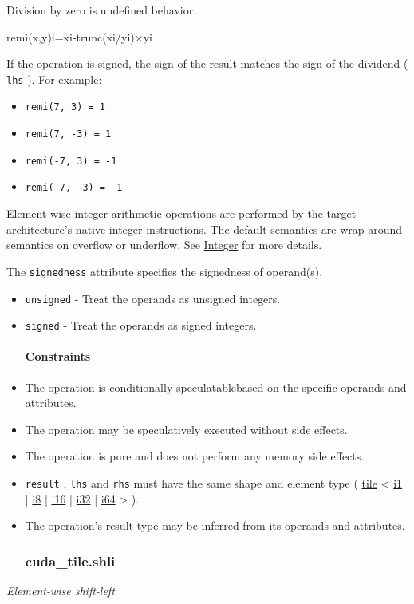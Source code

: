 \documentclass{article}
\begin{document}
Division by zero is undefined behavior.


remi(x,y)i=xi-trunc(xi/yi)×yi

If the operation is signed, the sign of the result matches the sign of the dividend ( \texttt{lhs} ). For example:


\begin{itemize}
\item \texttt{remi(7, 3) = 1}
\item \texttt{remi(7, -3) = 1}
\item \texttt{remi(-7, 3) = -1}
\item \texttt{remi(-7, -3) = -1}

\end{itemize}
Element-wise integer arithmetic operations are performed by the target architecture's native integer instructions. The default semantics are wrap-around semantics on overflow or underflow. See \href{https://docs.nvidia.com/cuda/tile-ir/latest/sections/operations.html#op-group-integer}{Integer} for more details.


The \texttt{signedness} attribute specifies the signedness of operand(s).


\begin{itemize}
\item \texttt{unsigned} - Treat the operands as unsigned integers.
\item \texttt{signed} - Treat the operands as signed integers.


\paragraph{Constraints}

\item The operation is conditionally speculatablebased on the specific operands and attributes.
\item The operation may be speculatively executed without side effects.
\item The operation is pure and does not perform any memory side effects.
\item \texttt{result} , \texttt{lhs} and \texttt{rhs} must have the same shape and element type ( \href{https://docs.nvidia.com/cuda/tile-ir/latest/sections/types.html#type-tile}{tile} < \href{https://docs.nvidia.com/cuda/tile-ir/latest/sections/types.html#subsection-element-types}{i1} | \href{https://docs.nvidia.com/cuda/tile-ir/latest/sections/types.html#subsection-element-types}{i8} | \href{https://docs.nvidia.com/cuda/tile-ir/latest/sections/types.html#subsection-element-types}{i16} | \href{https://docs.nvidia.com/cuda/tile-ir/latest/sections/types.html#subsection-element-types}{i32} | \href{https://docs.nvidia.com/cuda/tile-ir/latest/sections/types.html#subsection-element-types}{i64} > ).
\item The operation's result type may be inferred from its operands and attributes.


\subsubsection{cuda\_tile.shli}

\end{itemize}
\textit{Element-wise shift-left}
\end{document}
